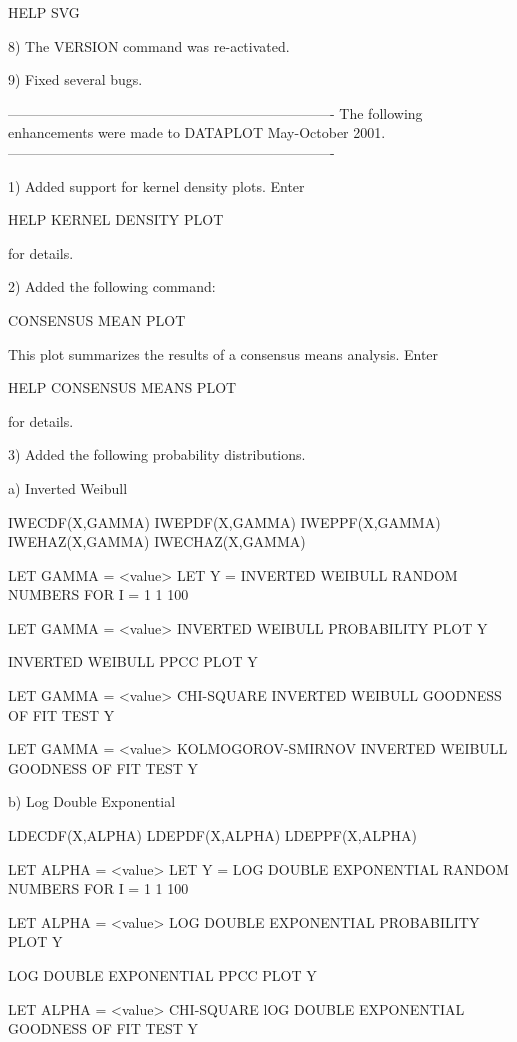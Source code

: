 {        HELP SVG

 8) The VERSION command was re-activated.

 9) Fixed several bugs.

----------------------------------------------------------------------
The following enhancements were made to DATAPLOT May-October     2001.
----------------------------------------------------------------------

 1) Added support for kernel density plots.  Enter

      HELP KERNEL DENSITY PLOT

    for details.

 2) Added the following command:

      CONSENSUS MEAN PLOT

    This plot summarizes the results of a consensus means analysis.
    Enter

      HELP CONSENSUS MEANS PLOT

    for details.

 3) Added the following probability distributions.

    a) Inverted Weibull

       IWECDF(X,GAMMA)
       IWEPDF(X,GAMMA)
       IWEPPF(X,GAMMA)
       IWEHAZ(X,GAMMA)
       IWECHAZ(X,GAMMA)

       LET GAMMA = <value>
       LET Y = INVERTED WEIBULL RANDOM NUMBERS FOR I = 1 1 100

       LET GAMMA = <value>
       INVERTED WEIBULL PROBABILITY PLOT Y

       INVERTED WEIBULL PPCC PLOT Y

       LET GAMMA = <value>
       CHI-SQUARE INVERTED WEIBULL GOODNESS OF FIT TEST Y

       LET GAMMA = <value>
       KOLMOGOROV-SMIRNOV INVERTED WEIBULL GOODNESS OF FIT TEST Y

    b) Log Double Exponential

       LDECDF(X,ALPHA)
       LDEPDF(X,ALPHA)
       LDEPPF(X,ALPHA)

       LET ALPHA = <value>
       LET Y = LOG DOUBLE EXPONENTIAL RANDOM NUMBERS FOR I = 1 1 100

       LET ALPHA = <value>
       LOG DOUBLE EXPONENTIAL PROBABILITY PLOT Y

       LOG DOUBLE EXPONENTIAL PPCC PLOT Y

       LET ALPHA = <value>
       CHI-SQUARE lOG DOUBLE EXPONENTIAL GOODNESS OF FIT TEST Y

}
